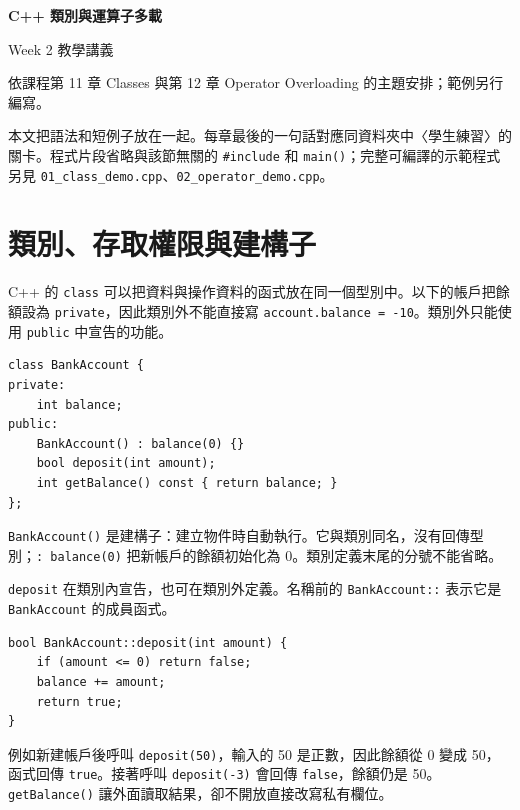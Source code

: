\documentclass[12pt,a4paper]{article}
\begin{document}
\begin{center}
  {\LARGE\bfseries C++ 類別與運算子多載}\par\vspace{0.4em}
  {\large Week 2 教學講義}\par\vspace{0.6em}
  {\small 依課程第 11 章 Classes 與第 12 章 Operator Overloading 的主題安排；範例另行編寫。}
\end{center}
\vspace{0.5em}
\tableofcontents
\vspace{0.8em}

本文把語法和短例子放在一起。每章最後的一句話對應同資料夾中〈學生練習〉的關卡。程式片段省略與該節無關的 \texttt{\#include} 和 \texttt{main()}；完整可編譯的示範程式另見 \texttt{01\_class\_demo.cpp}、\texttt{02\_operator\_demo.cpp}。

\section{類別、存取權限與建構子}

C++ 的 \texttt{class} 可以把資料與操作資料的函式放在同一個型別中。以下的帳戶把餘額設為 \texttt{private}，因此類別外不能直接寫 \texttt{account.balance = -10}。類別外只能使用 \texttt{public} 中宣告的功能。

\begin{lstlisting}
class BankAccount {
private:
    int balance;
public:
    BankAccount() : balance(0) {}
    bool deposit(int amount);
    int getBalance() const { return balance; }
};
\end{lstlisting}

\texttt{BankAccount()} 是建構子：建立物件時自動執行。它與類別同名，沒有回傳型別；\texttt{: balance(0)} 把新帳戶的餘額初始化為 0。類別定義末尾的分號不能省略。

\texttt{deposit} 在類別內宣告，也可在類別外定義。名稱前的 \texttt{BankAccount::} 表示它是 \texttt{BankAccount} 的成員函式。

\begin{lstlisting}
bool BankAccount::deposit(int amount) {
    if (amount <= 0) return false;
    balance += amount;
    return true;
}
\end{lstlisting}

例如新建帳戶後呼叫 \texttt{deposit(50)}，輸入的 50 是正數，因此餘額從 0 變成 50，函式回傳 \texttt{true}。接著呼叫 \texttt{deposit(-3)} 會回傳 \texttt{false}，餘額仍是 50。\texttt{getBalance()} 讓外面讀取結果，卻不開放直接改寫私有欄位。
\end{document}
